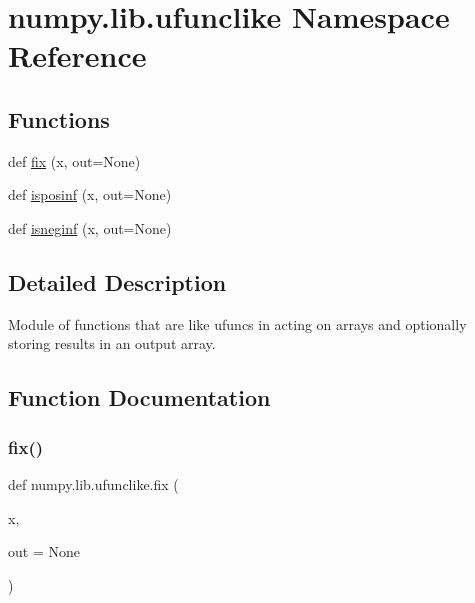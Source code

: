 \hypertarget{namespacenumpy_1_1lib_1_1ufunclike}{}\section{numpy.\+lib.\+ufunclike Namespace Reference}
\label{namespacenumpy_1_1lib_1_1ufunclike}
\subsection*{Functions}
\begin{DoxyCompactItemize}
\item 
def \hyperlink{namespacenumpy_1_1lib_1_1ufunclike_a708f437330f330a8ebc0b381b0226e23}{fix} (x, out=None)
\item 
def \hyperlink{namespacenumpy_1_1lib_1_1ufunclike_a8da95d2f19c9a65994dde5c4c5f1c1fb}{isposinf} (x, out=None)
\item 
def \hyperlink{namespacenumpy_1_1lib_1_1ufunclike_aefdea205b9dfdbf965988f1175d67191}{isneginf} (x, out=None)
\end{DoxyCompactItemize}


\subsection{Detailed Description}
\begin{DoxyVerb}Module of functions that are like ufuncs in acting on arrays and optionally
storing results in an output array.\end{DoxyVerb}
 

\subsection{Function Documentation}
\mbox{\label{namespacenumpy_1_1lib_1_1ufunclike_a708f437330f330a8ebc0b381b0226e23}} 
\subsubsection{\texorpdfstring{fix()}{fix()}}
{\footnotesize\ttfamily def numpy.\+lib.\+ufunclike.\+fix (\begin{DoxyParamCaption}\item[{}]{x,  }\item[{}]{out = {\ttfamily None} }\end{DoxyParamCaption})}

